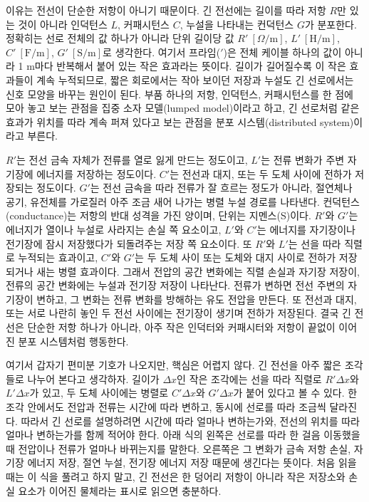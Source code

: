 이유는 전선이 단순한 저항이 아니기 때문이다.
긴 전선에는 길이를 따라 저항 $R$만 있는 것이 아니라 인덕턴스 $L$, 커패시턴스 $C$, 누설을 나타내는 컨덕턴스 $G$가 분포한다.
정확히는 선로 전체의 값 하나가 아니라 단위 길이당 값 $R'~[\Omega/\mathrm{m}]$, $L'~[\mathrm{H}/\mathrm{m}]$, $C'~[\mathrm{F}/\mathrm{m}]$, $G'~[\mathrm{S}/\mathrm{m}]$로 생각한다.
여기서 프라임($'$)은 전체 케이블 하나의 값이 아니라 1 m마다 반복해서 붙어 있는 작은 효과라는 뜻이다.
길이가 길어질수록 이 작은 효과들이 계속 누적되므로, 짧은 회로에서는 작아 보이던 저장과 누설도 긴 선로에서는 신호 모양을 바꾸는 원인이 된다.
부품 하나의 저항, 인덕턴스, 커패시턴스를 한 점에 모아 놓고 보는 관점을 집중 소자 모델(lumped model)이라고 하고, 긴 선로처럼 같은 효과가 위치를 따라 계속 퍼져 있다고 보는 관점을 분포 시스템(distributed system)이라고 부른다.

$R'$는 전선 금속 자체가 전류를 열로 잃게 만드는 정도이고, $L'$는 전류 변화가 주변 자기장에 에너지를 저장하는 정도이다.
$C'$는 전선과 대지, 또는 두 도체 사이에 전하가 저장되는 정도이다.
$G'$는 전선 금속을 따라 전류가 잘 흐르는 정도가 아니라, 절연체나 공기, 유전체를 가로질러 아주 조금 새어 나가는 병렬 누설 경로를 나타낸다.
컨덕턴스(conductance)는 저항의 반대 성격을 가진 양이며, 단위는 지멘스(S)이다.
$R'$와 $G'$는 에너지가 열이나 누설로 사라지는 손실 쪽 요소이고, $L'$와 $C'$는 에너지를 자기장이나 전기장에 잠시 저장했다가 되돌려주는 저장 쪽 요소이다.
또 $R'$와 $L'$는 선을 따라 직렬로 누적되는 효과이고, $C'$와 $G'$는 두 도체 사이 또는 도체와 대지 사이로 전하가 저장되거나 새는 병렬 효과이다.
그래서 전압의 공간 변화에는 직렬 손실과 자기장 저장이, 전류의 공간 변화에는 누설과 전기장 저장이 나타난다.
전류가 변하면 전선 주변의 자기장이 변하고, 그 변화는 전류 변화를 방해하는 유도 전압을 만든다.
또 전선과 대지, 또는 서로 나란히 놓인 두 전선 사이에는 전기장이 생기며 전하가 저장된다.
결국 긴 전선은 단순한 저항 하나가 아니라, 아주 작은 인덕터와 커패시터와 저항이 끝없이 이어진 분포 시스템처럼 행동한다.

여기서 갑자기 편미분 기호가 나오지만, 핵심은 어렵지 않다.
긴 전선을 아주 짧은 조각들로 나누어 본다고 생각하자.
길이가 $\Delta x$인 작은 조각에는 선을 따라 직렬로 $R'\Delta x$와 $L'\Delta x$가 있고, 두 도체 사이에는 병렬로 $C'\Delta x$와 $G'\Delta x$가 붙어 있다고 볼 수 있다.
한 조각 안에서도 전압과 전류는 시간에 따라 변하고, 동시에 선로를 따라 조금씩 달라진다.
따라서 긴 선로를 설명하려면 시간에 따라 얼마나 변하는가와, 전선의 위치를 따라 얼마나 변하는가를 함께 적어야 한다.
아래 식의 왼쪽은 선로를 따라 한 걸음 이동했을 때 전압이나 전류가 얼마나 바뀌는지를 말한다.
오른쪽은 그 변화가 금속 저항 손실, 자기장 에너지 저장, 절연 누설, 전기장 에너지 저장 때문에 생긴다는 뜻이다.
처음 읽을 때는 이 식을 풀려고 하지 말고, 긴 전선은 한 덩어리 저항이 아니라 작은 저장소와 손실 요소가 이어진 물체라는 표시로 읽으면 충분하다.

